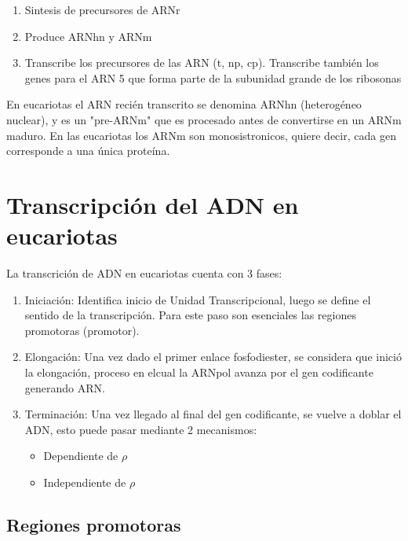 \begin{enumerate}
    \item Sintesis de precursores de ARNr
    \item Produce ARNhn y ARNm
    \item Transcribe los precursores de las ARN (t, np, cp). Transcribe también los genes para el ARN 5 que forma parte de la subunidad grande de los ribosonas
\end{enumerate}

En eucariotas el ARN recién transcrito se denomina ARNhn (heterogéneo nuclear), y es un "pre-ARNm" que es procesado antes de convertirse en un ARNm maduro. En las eucariotas los ARNm son monosistronicos, quiere decir, cada gen corresponde a una única proteína.
	
\section{Transcripción del ADN en eucariotas}

La transcrición de ADN en eucariotas cuenta con 3 fases:

\begin{enumerate}
    \item Iniciación: Identifica inicio de Unidad Transcripcional, luego se define el sentido de la transcripción. Para este paso son esenciales las regiones promotoras (promotor).
    \item Elongación: Una vez dado el primer enlace fosfodiester, se considera que inició la elongación, proceso en elcual la ARNpol avanza por el gen codificante generando ARN.
    \item Terminación: Una vez llegado al final del gen codificante, se vuelve a doblar el ADN, esto puede pasar mediante 2 mecanismos:
        \begin{itemize}
            \item Dependiente de $\rho$
            \item Independiente de $\rho$
        \end{itemize}
\end{enumerate}

\subsection{Regiones promotoras}

